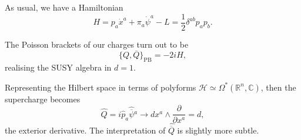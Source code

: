 As usual, we have a Hamiltonian
\begin{equation}
  H = p_a \dot{x}^a + \pi_a \dot{\psi}^a - L = \frac{1}{2} \delta^{ab} p_a p_b.
\end{equation}
\begin{claim}
  The Poisson brackets of our charges turn out to be
  \begin{equation}
    \{ Q, \overline{Q}{} \}_{\text{PB}} = -2i H,
  \end{equation}
  realising the SUSY algebra in $d = 1$.
\end{claim} 

Representing the Hilbert space in terms of polyforms $\mathscr{H} \simeq \Omega^* (\mathbb{R}^n, \mathbb{C})$, then the supercharge becomes
\begin{equation}
  \hat{Q} = i \hat{p}_a \hat{\overline{\psi}}{}^a \rightarrow dx^a \wedge \frac{\partial }{\partial x^a} = d,
\end{equation}
the exterior derivative.
The interpretation of $\hat{\overline{Q}{}}$ is slightly more subtle.

